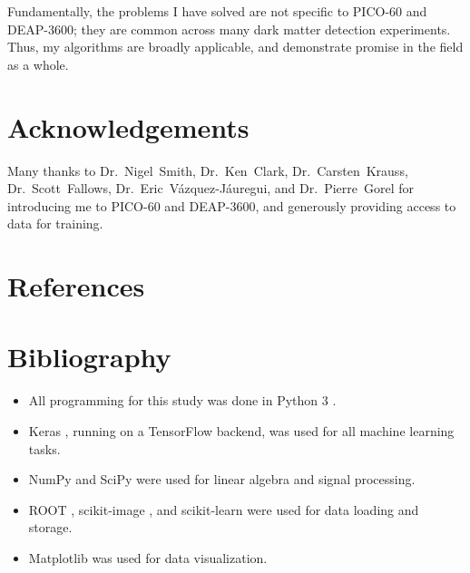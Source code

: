 \documentclass[12pt]{article}
\begin{document}
Fundamentally, the problems I have solved are not specific to PICO-60 and DEAP-3600; they are common across many dark matter detection experiments. Thus, my algorithms are broadly applicable, and demonstrate promise in the field as a whole.

\section{Acknowledgements}

Many thanks to Dr.~Nigel~Smith, Dr.~Ken~Clark, Dr.~Carsten~Krauss, Dr.~Scott~Fallows, Dr.~Eric~V\'azquez-J\'auregui, and Dr.~Pierre~Gorel for introducing me to PICO-60 and DEAP-3600, and generously providing access to data for training.

\section{References}

\printbibliography[heading=none]

\pagebreak

\section{Bibliography}

\begin{itemize}
    \item All programming for this study was done in Python 3 \cite{python}.
    \item Keras \cite{keras}, running on a TensorFlow \cite{tensorflow} backend, was used for all machine learning tasks.
    \item NumPy \cite{numpy} and SciPy \cite{scipy} were used for linear algebra and signal processing.
    \item ROOT \cite{root}, scikit-image \cite{scikit-image}, and scikit-learn \cite{scikit-learn} were used for data loading and storage.
    \item Matplotlib \cite{matplotlib} was used for data visualization.
\end{itemize}
\end{document}
